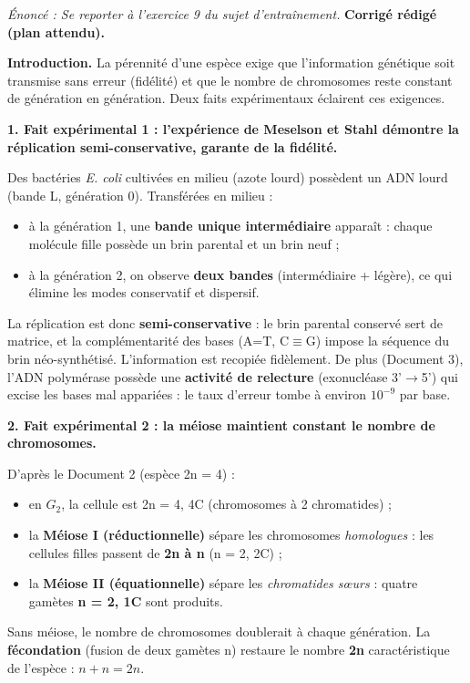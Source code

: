 \documentclass[11pt]{article}
\begin{document}
\begin{corrige}
\textit{Énoncé : Se reporter à l'exercice 9 du sujet d'entraînement.}
\tcblower
\textbf{Corrigé rédigé (plan attendu).}

\textbf{Introduction.} La pérennité d'une espèce exige que l'information génétique soit transmise sans erreur (fidélité) et que le nombre de chromosomes reste constant de génération en génération. Deux faits expérimentaux éclairent ces exigences.

\textbf{1. Fait expérimental 1 : l'expérience de Meselson et Stahl démontre la réplication semi-conservative, garante de la fidélité.}

Des bactéries \emph{E. coli} cultivées en milieu  (azote lourd) possèdent un ADN lourd (bande L, génération 0). Transférées en milieu  :
\begin{itemize}
    \item à la génération 1, une \textbf{bande unique intermédiaire} apparaît : chaque molécule fille possède un brin parental  et un brin neuf  ;
    \item à la génération 2, on observe \textbf{deux bandes} (intermédiaire + légère), ce qui élimine les modes conservatif et dispersif.
\end{itemize}
La réplication est donc \textbf{semi-conservative} : le brin parental conservé sert de matrice, et la complémentarité des bases (A=T, C$\equiv$G) impose la séquence du brin néo-synthétisé. L'information est recopiée fidèlement. De plus (Document 3), l'ADN polymérase possède une \textbf{activité de relecture} (exonucléase 3'$\to$5') qui excise les bases mal appariées : le taux d'erreur tombe à environ $10^{-9}$ par base.

\textbf{2. Fait expérimental 2 : la méiose maintient constant le nombre de chromosomes.}

D'après le Document 2 (espèce 2n = 4) :
\begin{itemize}
    \item en $G_2$, la cellule est 2n = 4, 4C (chromosomes à 2 chromatides) ;
    \item la \textbf{Méiose I (réductionnelle)} sépare les chromosomes \emph{homologues} : les cellules filles passent de \textbf{2n à n} (n = 2, 2C) ;
    \item la \textbf{Méiose II (équationnelle)} sépare les \emph{chromatides sœurs} : quatre gamètes \textbf{n = 2, 1C} sont produits.
\end{itemize}
Sans méiose, le nombre de chromosomes doublerait à chaque génération. La \textbf{fécondation} (fusion de deux gamètes n) restaure le nombre \textbf{2n} caractéristique de l'espèce : $n + n = 2n$.


\end{corrige}
\end{document}
